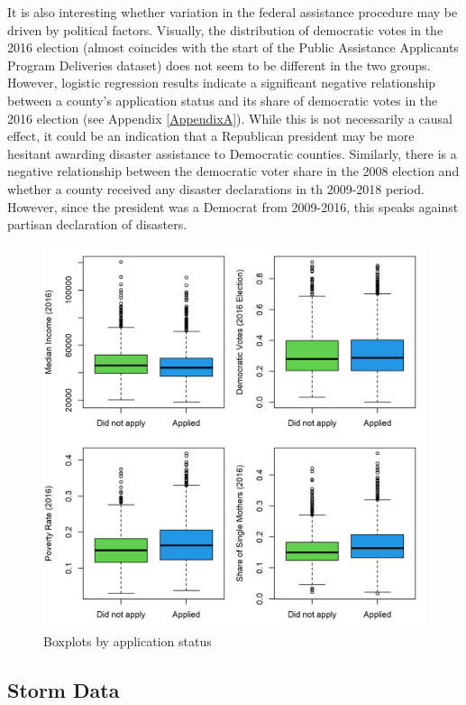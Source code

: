 It is also interesting whether variation in the federal assistance procedure may be driven by political factors. Visually, the distribution of democratic votes in the 2016 election (almost coincides with the start of the Public Assistance Applicants Program Deliveries dataset) does not seem to be different in the two groups. However, logistic regression results indicate a significant negative relationship between a county's application status and its share of democratic votes in the 2016 election (see Appendix \ref{AppendixA}). While this is not necessarily a causal effect, it could be an indication that a Republican president may be more hesitant awarding disaster assistance to Democratic counties. Similarly, there is a negative relationship between the democratic voter share in the 2008 election and whether a county received any disaster declarations in th 2009-2018 period. However, since the president was a Democrat from 2009-2016, this speaks against partisan declaration of disasters.

\begin{figure}[!h]
	\centering
	\includegraphics[scale=1]{"../Code & Data/AssistanceCovBoxplot.png"}
	\caption{Boxplots by application status}
	\label{AssistCovBoxplot}
\end{figure}


\subsection{Storm Data}

